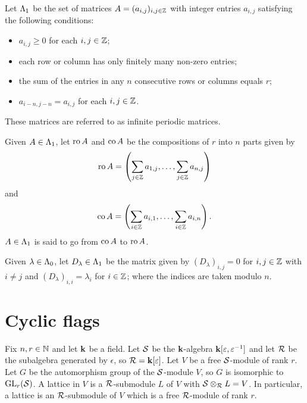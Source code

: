 \documentclass[a4paper, 11pt]{report}
\begin{document}
\begin{definition}\label{def:matrices}
Let ${\Lambda_1}$ be the set of matrices $A=(a_{i,j})_{i,j\in\mathbb{Z}}$ with integer entries $a_{i,j}$ satisfying the following conditions: 
\begin{itemize}
\item
$a_{i,j}\geq 0$ for each $i,j\in\mathbb{Z}$;
\item
each row or column has only finitely many non-zero entries;
\item
the sum of the entries in any $n$ consecutive rows or columns equals $r$;
\item
$a_{i-n,j-n}=a_{i,j}$ for each $i,j\in\mathbb{Z}$.
\end{itemize}
These matrices are referred to as infinite periodic matrices.
\end{definition}

\begin{definition}\label{def:source-target}
Given $A\in{\Lambda_1}$, let $\operatorname{ro}{A}$ and $\operatorname{co}{A}$ be the compositions of $r$ into $n$ parts given by
\begin{equation*}
\operatorname{ro}{A} = \left( \sum_{j\in\mathbb{Z}}a_{1,j}, \ldots, \sum_{j\in\mathbb{Z}} a_{n,j}\right)
\end{equation*}
and
\begin{equation*}
\operatorname{co}{A} = \left( \sum_{i\in\mathbb{Z}} a_{i,1}, \ldots, \sum_{i\in\mathbb{Z}} a_{i,n}\right).
\end{equation*}
$A\in{\Lambda_1}$ is said to go from $\operatorname{co}{A}$ to $\operatorname{ro}{A}$.
\end{definition}

\begin{definition}\label{def:diagonal-matrices}
Given $\lambda\in{\Lambda_0}$, let $D_\lambda\in{\Lambda_1}$ be the matrix given by $(D_\lambda)_{i,j}=0$ for $i,j\in\mathbb{Z}$ with $i\neq j$ and $(D_\lambda)_{i,i}=\lambda_i$ for $i\in\mathbb{Z}$; where the indices are taken modulo $n$.
\end{definition}

\section{Cyclic flags}

Fix $n,r\in\mathbb{N}$ and let $\mathbf{k}$ be a field. Let $\mathcal{S}$ be the $\mathbf{k}$-algebra $\mathbf{k}[\varepsilon,\varepsilon^{-1}]$ and let $\mathcal{R}$ be the subalgebra generated by $\epsilon$, so $\mathcal{R} = \mathbf{k}[\varepsilon]$. Let $V$ be a free $\mathcal{S}$-module of rank $r$. Let $G$ be the automorphism group of the $\mathcal{S}$-module $V$, so $G$ is isomorphic to $\operatorname{GL}_{r}(\mathcal{S})$. A lattice in $V$ is a $\mathcal{R}$-submodule $L$ of $V$ with $\mathcal{S}\otimes_{\mathcal{R}} L = V$. In particular, a lattice is an $\mathcal{R}$-submodule of $V$ which is a free $\mathcal{R}$-module of rank $r$.
\end{document}
